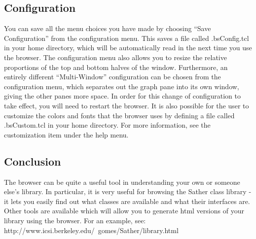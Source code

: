 \subsection{Configuration}
	You can save all the menu choices you have made by choosing
``Save Configuration'' from the configuration menu. This saves a file
called .bsConfig.tcl in your home directory, which will be
automatically read in the next time you use the browser.  The
configuration menu also allows you to resize the relative proportions
of the top and bottom halves of the window.  Furthermore, an entirely
different ``Multi-Window'' configuration can be chosen from the
configuration menu, which separates out the graph pane into its own
window, giving the other panes more space.  In order for this change
of configuration to take effect, you will need to restart the browser.
        It is also possible for the user to customize the colors
and fonts that the browser uses by defining a file called .bsCustom.tcl
in your home directory.  For more information, see the customization
item under the help menu.
 
\subsection{Conclusion}
	The browser can be quite a useful tool in understanding your
own or someone else's library.  In particular, it is very useful for
browsing the Sather class library - it lets you easily find out what
classes are available and what their interfaces are.  Other tools
are available which will allow you to generate html versions of
your library using the browser. For an example, see:
http://www.icsi.berkeley.edu/~gomes/Sather/library.html

	



 	
	
	


